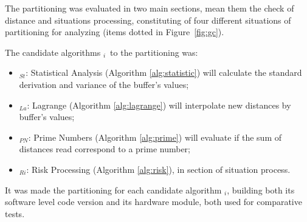         The partitioning was evaluated in two main sections, mean them the check of distance and situations processing, constituting of four different situations of partitioning for analyzing (items dotted in Figure~\ref{fig:gc}).
        
        The candidate algorithms \A$_{i}$\ to the partitioning was:
        
        \begin{itemize}
            \item \A$_{St}$: Statistical Analysis (Algorithm \ref{alg:statistic}) will calculate the standard derivation and variance of the buffer's values;
            
            \item \A$_{La}$: Lagrange (Algorithm \ref{alg:lagrange}) will interpolate new distances by buffer's values;
            
            \item \A$_{PN}$: Prime Numbers (Algorithm \ref{alg:prime}) will evaluate if the sum of distances read correspond to a prime number;
            
            \item \A$_{Ri}$: Risk Processing (Algorithm \ref{alg:risk}), in section of situation process.
        \end{itemize}
    
    
        
        
        It was made the partitioning for each candidate algorithm \A$_{i}$, building both its software level code version and its hardware module, both used for comparative tests.
        
